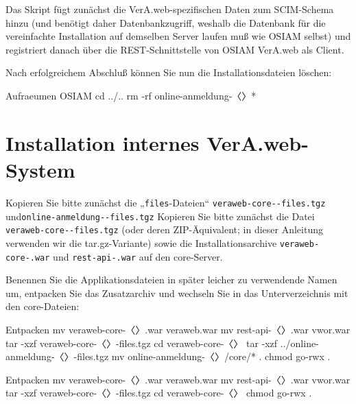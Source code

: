 Das Skript fügt zunächst die VerA.web-spezifischen Daten
zum SCIM-Schema hinzu (und benötigt daher Datenbankzugriff,
weshalb die Datenbank für die vereinfachte Installation
auf demselben Server laufen muß wie OSIAM selbst) und
registriert danach über die REST-Schnittstelle von OSIAM
VerA.web als Client.

\begin{minipage}{\textwidth}
Nach erfolgreichem Abschluß können Sie nun die
Installationsdateien löschen:

\begin{lstdump}{Aufraeumen OSIAM}
cd ../..
rm -rf online-anmeldung-〈\lstdumpesc{\vwiaverssw}〉*
\end{lstdump}
\end{minipage}

\fi%

\section{Installation internes VerA.web-System}\label{sec:setup-int}

\ifoa
Kopieren Sie bitte zunächst die „\texttt{files}-Dateien“
\texttt{veraweb-core-\vwiaverssw{}-files.tgz} und\linebreak[1]
\texttt{online-anmeldung-\vwiaverssw{}-files.tgz}
\else%
Kopieren Sie bitte zunächst die Datei
\texttt{veraweb-core-\vwiaverssw{}-files.tgz}
\fi%
(oder deren ZIP-Äquivalent; in dieser Anleitung verwenden
wir die tar.gz-Variante) sowie die Installationsarchive
\texttt{veraweb-core-\vwiaverssw{}.war}
und \texttt{rest-api-\vwiaverssw{}.war} auf den core-Server.

\begin{minipage}{\textwidth}
Benennen Sie die Applikationsdateien in später leicher zu
verwendende Namen um, entpacken Sie das Zusatzarchiv und
wechseln Sie in das Unterverzeichnis mit den core-Dateien:

\ifoa
\begin{lstdump}{Entpacken}
mv veraweb-core-〈\lstdumpesc{\vwiaverssw}〉.war veraweb.war
mv rest-api-〈\lstdumpesc{\vwiaverssw}〉.war vwor.war
tar -xzf veraweb-core-〈\lstdumpesc{\vwiaverssw}〉-files.tgz
cd veraweb-core-〈\lstdumpesc{\vwiaverssw}〉
tar -xzf ../online-anmeldung-〈\lstdumpesc{\vwiaverssw}〉-files.tgz
mv online-anmeldung-〈\lstdumpesc{\vwiaverssw}〉/core/* .
chmod go-rwx .
\end{lstdump}
\else%
\begin{lstdump}{Entpacken}
mv veraweb-core-〈\lstdumpesc{\vwiaverssw}〉.war veraweb.war
mv rest-api-〈\lstdumpesc{\vwiaverssw}〉.war vwor.war
tar -xzf veraweb-core-〈\lstdumpesc{\vwiaverssw}〉-files.tgz
cd veraweb-core-〈\lstdumpesc{\vwiaverssw}〉
chmod go-rwx .
\end{lstdump}
\fi%
\end{minipage}

